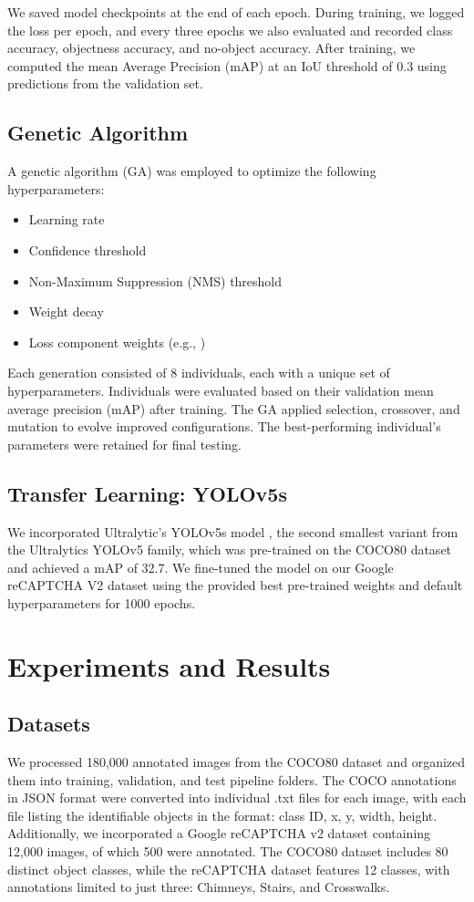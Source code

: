 \documentclass{article}
\begin{document}
We saved model checkpoints at the end of each epoch. During training, we logged the loss per epoch, and every three epochs we also evaluated and recorded class accuracy, objectness accuracy, and no-object accuracy. After training, we computed the mean Average Precision (mAP) at an IoU threshold of 0.3 using predictions from the validation set.

\subsection{Genetic Algorithm}

A genetic algorithm (GA) was employed to optimize the following hyperparameters:
\begin{itemize}
\item Learning rate
\item Confidence threshold
\item Non-Maximum Suppression (NMS) threshold
\item Weight decay
\item Loss component weights (e.g., )
\end{itemize}

Each generation consisted of 8 individuals, each with a unique set of hyperparameters. Individuals were evaluated based on their validation mean average precision (mAP) after training. The GA applied selection, crossover, and mutation to evolve improved configurations. The best-performing individual’s parameters were retained for final testing.

\subsection{Transfer Learning: YOLOv5s}
We incorporated Ultralytic's YOLOv5s model \cite{ultralytics2020yolov5} , the second smallest variant from the Ultralytics YOLOv5 family, which was pre-trained on the COCO80 dataset and achieved a mAP of 32.7. We fine-tuned the model on our Google reCAPTCHA V2 dataset using the provided best pre-trained weights and default hyperparameters for 1000 epochs.

\section{Experiments and Results}
\label{results}
\subsection{Datasets}
We processed 180,000 annotated images from the COCO80 dataset and organized them into training, validation, and test pipeline folders. The COCO annotations in JSON format were converted into individual .txt files for each image, with each file listing the identifiable objects in the format: class ID, x, y, width, height. Additionally, we incorporated a Google reCAPTCHA v2 dataset containing 12,000 images, of which 500 were annotated. The COCO80 dataset includes 80 distinct object classes, while the reCAPTCHA dataset features 12 classes, with annotations limited to just three: Chimneys, Stairs, and Crosswalks.
\end{document}
